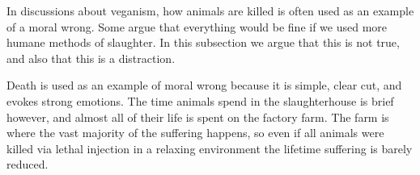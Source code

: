 In discussions about veganism, how animals are killed is often used as an example of a moral wrong. Some argue that everything would be fine if we used more humane methods of slaughter. In this subsection we argue that this is not true, and also that this is a distraction.

Death is used as an example of moral wrong because it is simple, clear cut, and evokes strong emotions. The time animals spend in the slaughterhouse is brief however, and almost all of their life is spent on the factory farm. The farm is where the vast majority of the suffering happens, so even if all animals were killed via lethal injection in a relaxing environment the lifetime suffering is barely reduced.